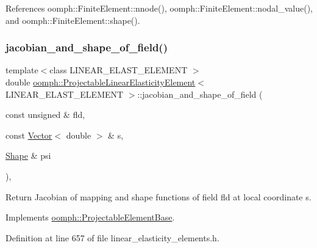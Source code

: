 References oomph\+::\+Finite\+Element\+::nnode(), oomph\+::\+Finite\+Element\+::nodal\+\_\+value(), and oomph\+::\+Finite\+Element\+::shape().

\mbox{\label{classoomph_1_1ProjectableLinearElasticityElement_a67ba02d25acfba604dbdc3446cab9158}} 
\subsubsection{\texorpdfstring{jacobian\+\_\+and\+\_\+shape\+\_\+of\+\_\+field()}{jacobian\_and\_shape\_of\_field()}}
{\footnotesize\ttfamily template$<$class L\+I\+N\+E\+A\+R\+\_\+\+E\+L\+A\+S\+T\+\_\+\+E\+L\+E\+M\+E\+NT $>$ \\
double \hyperlink{classoomph_1_1ProjectableLinearElasticityElement}{oomph\+::\+Projectable\+Linear\+Elasticity\+Element}$<$ L\+I\+N\+E\+A\+R\+\_\+\+E\+L\+A\+S\+T\+\_\+\+E\+L\+E\+M\+E\+NT $>$\+::jacobian\+\_\+and\+\_\+shape\+\_\+of\+\_\+field (\begin{DoxyParamCaption}\item[{const unsigned \&}]{fld,  }\item[{const \hyperlink{classoomph_1_1Vector}{Vector}$<$ double $>$ \&}]{s,  }\item[{\hyperlink{classoomph_1_1Shape}{Shape} \&}]{psi }\end{DoxyParamCaption})\hspace{0.3cm}{\ttfamily [inline]}, {\ttfamily [virtual]}}



Return Jacobian of mapping and shape functions of field fld at local coordinate s. 



Implements \hyperlink{classoomph_1_1ProjectableElementBase_ad45c21b58c0985d52f68ab2d79cbb488}{oomph\+::\+Projectable\+Element\+Base}.



Definition at line 657 of file linear\+\_\+elasticity\+\_\+elements.\+h.



